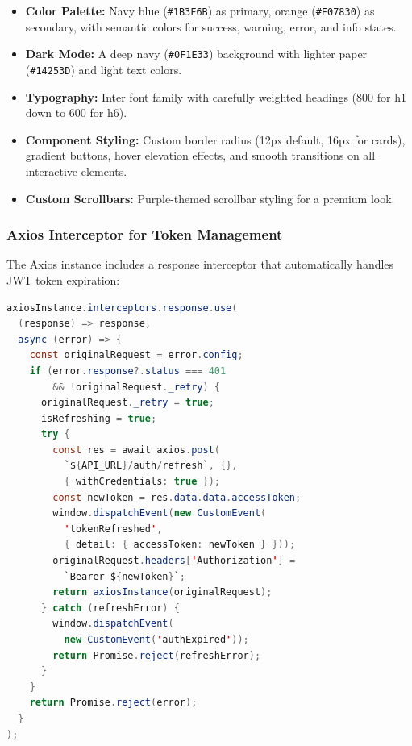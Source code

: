 \begin{itemize}[leftmargin=2em]
    \item \textbf{Color Palette:} Navy blue (\texttt{\#1B3F6B}) as primary, orange (\texttt{\#F07830}) as secondary, with semantic colors for success, warning, error, and info states.
    \item \textbf{Dark Mode:} A deep navy (\texttt{\#0F1E33}) background with lighter paper (\texttt{\#14253D}) and light text colors.
    \item \textbf{Typography:} Inter font family with carefully weighted headings (800 for h1 down to 600 for h6).
    \item \textbf{Component Styling:} Custom border radius (12px default, 16px for cards), gradient buttons, hover elevation effects, and smooth transitions on all interactive elements.
    \item \textbf{Custom Scrollbars:} Purple-themed scrollbar styling for a premium look.
\end{itemize}

\subsubsection{Axios Interceptor for Token Management}

The Axios instance includes a response interceptor that automatically handles JWT token expiration:

\begin{lstlisting}[language=Java, caption={Token Refresh Interceptor (axiosInstance.js)}]
axiosInstance.interceptors.response.use(
  (response) => response,
  async (error) => {
    const originalRequest = error.config;
    if (error.response?.status === 401 
        && !originalRequest._retry) {
      originalRequest._retry = true;
      isRefreshing = true;
      try {
        const res = await axios.post(
          `${API_URL}/auth/refresh`, {}, 
          { withCredentials: true });
        const newToken = res.data.data.accessToken;
        window.dispatchEvent(new CustomEvent(
          'tokenRefreshed', 
          { detail: { accessToken: newToken } }));
        originalRequest.headers['Authorization'] = 
          `Bearer ${newToken}`;
        return axiosInstance(originalRequest);
      } catch (refreshError) {
        window.dispatchEvent(
          new CustomEvent('authExpired'));
        return Promise.reject(refreshError);
      }
    }
    return Promise.reject(error);
  }
);
\end{lstlisting}

